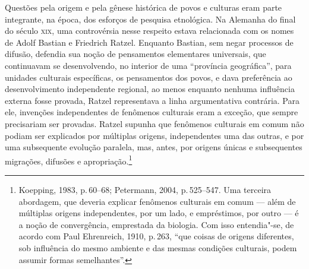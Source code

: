 Questões pela origem e pela gênese histórica de povos e culturas eram
parte integrante, na época, dos esforços de pesquisa etnológica. Na
Alemanha do final do século \textsc{xix}, uma controvérsia nesse respeito estava
relacionada com os nomes de Adolf Bastian e Friedrich Ratzel. 
Enquanto Bastian, sem negar processos de difusão, defendia
sua noção de pensamentos elementares universais, 
que continuavam se desenvolvendo, no interior de uma ``província geográfica'', 
para unidades culturais específicas, os pensamentos dos povos,
e dava preferência ao
desenvolvimento independente regional, ao menos enquanto nenhuma
influência externa fosse provada, Ratzel representava a linha
argumentativa contrária. Para ele, invenções independentes de fenômenos
culturais eram a exceção, que sempre precisariam ser provadas. Ratzel
supunha que fenômenos culturais em comum não podiam ser explicados por
múltiplas origens, independentes uma das outras, e por uma subsequente
evolução paralela, mas, antes, por origens únicas e subsequentes
migrações, difusões e apropriação.\footnote{Koepping, 1983, p.\,60--68;
  Petermann, 2004, p.\,525--547. Uma terceira abordagem, que deveria
  explicar fenômenos culturais em comum --- além de múltiplas origens
  independentes, por um lado, e empréstimos, por outro --- é a noção de
  convergência, emprestada da biologia. Com isso entendia"-se, de acordo
  com Paul Ehrenreich, 1910, p.\,263, ``que coisas de origens
  diferentes, sob influência do mesmo ambiente e das mesmas condições
  culturais, podem assumir formas semelhantes''.}

